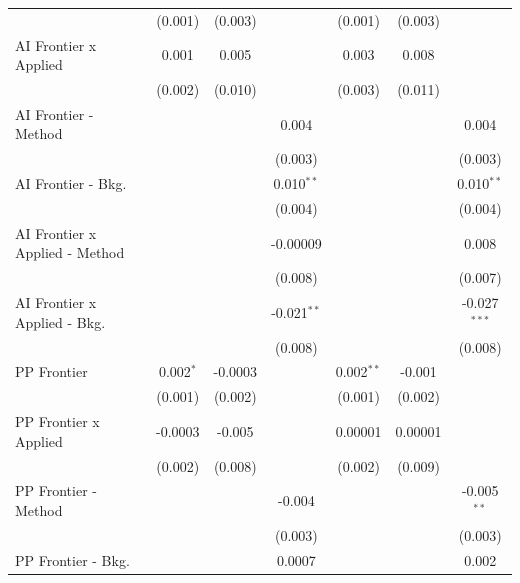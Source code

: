 \begin{tabular}{lcccccc}
                                  & (0.001)     & (0.003) &               & (0.001)      & (0.003) &   \\   
   AI Frontier x Applied          & 0.001       & 0.005   &               & 0.003        & 0.008   &   \\   
                                  & (0.002)     & (0.010) &               & (0.003)      & (0.011) &   \\   
   AI Frontier - Method           &             &         & 0.004         &              &         & 0.004\\   
                                  &             &         & (0.003)       &              &         & (0.003)\\   
   AI Frontier - Bkg.             &             &         & 0.010$^{**}$  &              &         & 0.010$^{**}$\\   
                                  &             &         & (0.004)       &              &         & (0.004)\\   
   AI Frontier x Applied - Method &             &         & -0.00009      &              &         & 0.008\\   
                                  &             &         & (0.008)       &              &         & (0.007)\\   
   AI Frontier x Applied - Bkg.   &             &         & -0.021$^{**}$ &              &         & -0.027$^{***}$\\   
                                  &             &         & (0.008)       &              &         & (0.008)\\   
   PP Frontier                    & 0.002$^{*}$ & -0.0003 &               & 0.002$^{**}$ & -0.001  &   \\   
                                  & (0.001)     & (0.002) &               & (0.001)      & (0.002) &   \\   
   PP Frontier x Applied          & -0.0003     & -0.005  &               & 0.00001      & 0.00001 &   \\   
                                  & (0.002)     & (0.008) &               & (0.002)      & (0.009) &   \\   
   PP Frontier - Method           &             &         & -0.004        &              &         & -0.005$^{**}$\\   
                                  &             &         & (0.003)       &              &         & (0.003)\\   
   PP Frontier - Bkg.             &             &         & 0.0007        &              &         & 0.002\\   

\end{tabular}
